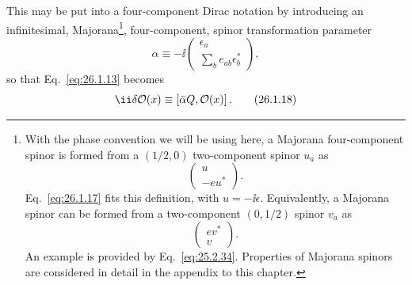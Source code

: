 This may be put into a four-component Dirac notation by introducing an
infinitesimal, Majorana\footnote{With the phase convention we will be using
here, a Majorana four-component spinor is formed from a \((1/2,0)\)
two-component spinor \(u_a\) as
\[
  \begin{pmatrix}u\\-eu^*\end{pmatrix}.
\]
Eq.~\eqref{eq:26.1.17} fits this definition, with \(u=-\ii\epsilon\).
Equivalently, a Majorana spinor can be formed from a two-component
\((0,1/2)\) spinor \(v_a\) as
\[
  \begin{pmatrix}ev^*\\v\end{pmatrix}.
\]
An example is provided by Eq.~\eqref{eq:25.2.34}. Properties of Majorana
spinors are considered in detail in the appendix to this chapter.},
four-component, spinor transformation parameter
\begin{equation}
  \alpha\equiv-\ii
  \begin{pmatrix}
    \epsilon_a\\
    \displaystyle\sum_b e_{ab}\epsilon_b^*
  \end{pmatrix},
  \tag{26.1.17}\label{eq:26.1.17}
\end{equation}
so that Eq.~\eqref{eq:26.1.13} becomes
\begin{equation}
  \ii\delta\mathcal{O}(x)\equiv
  [\bar{\alpha}\MajoranaQ,\mathcal{O}(x)]\,.
  \tag{26.1.18}\label{eq:26.1.18}
\end{equation}


